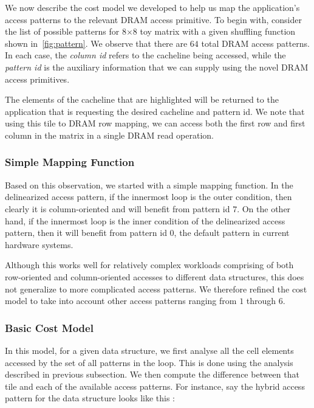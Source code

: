 \documentclass[letterpaper]{article}
\begin{document}
We now describe the cost model we developed to help us map the
application's access patterns to the relevant DRAM access primitive.
To begin with, consider the list of possible patterns for 8$\times$8 
toy matrix with a given shuffling function shown in~\cref{fig:pattern}. 
We observe that there are $64$ total DRAM access patterns. 
In each case, the \textit{column id} refers to the cacheline being accessed,
while the \textit{pattern id} is the auxiliary information that we can 
supply using the novel DRAM access primitives.

The elements of the cacheline that are highlighted will be returned to the 
application that is requesting the desired cacheline and pattern id.
We note that using this tile to DRAM row mapping, we can access both
the first row and first column in the matrix in a single DRAM read operation.

\subsubsection{Simple Mapping Function}

Based on this observation, we started with a simple mapping function.
In the delinearized access pattern, if the innermost loop is the outer 
condition, then clearly it is column-oriented and will benefit from 
pattern id $7$. On the other hand, if the innermost loop is the inner
condition of the delinearized access pattern, then it will benefit
from pattern id $0$, the default pattern in current hardware systems.

Although this works well for relatively complex workloads comprising
of both row-oriented and column-oriented accesses to different 
data structures, this does not generalize to more complicated access
patterns. We therefore refined the cost model to take into account
other access patterns ranging from $1$ through $6$.

\subsubsection{Basic Cost Model}

In this model, for a given data structure, we first analyse all the cell
elements accessed by the set of all patterns in the loop. This is done
using the analysis described in previous subsection. We then compute
the difference between that tile and each of the available access patterns.
For instance, say the hybrid access pattern for the data structure looks
like this :
\end{document}
